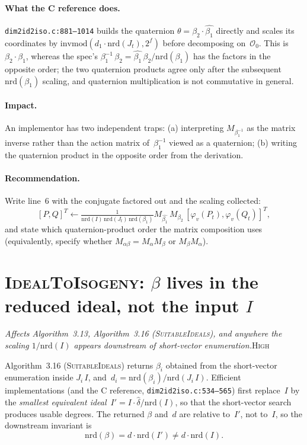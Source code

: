 \documentclass[a4paper,11pt]{article}
\newcommand{\algo}[1]{Algorithm~#1}
\newcommand{\high}{\textsc{\color{BurntOrange}High}}
\newcommand{\finding}[2]{\noindent\textit{#1}\hfill#2\par\smallskip}
\begin{document}
\paragraph{What the C reference does.}
\texttt{dim2id2iso.c:881--1014} builds the quaternion
$\theta = \beta_2 \cdot \widehat{\beta_1}$ directly and scales its
coordinates by $\mathrm{invmod}(d_1 \cdot \mathrm{nrd}(J_t),
2^f)$ before decomposing on~$\mathcal{O}_0$.  This is
$\beta_2 \cdot \widehat{\beta_1}$, whereas the spec's
$\beta_1^{-1}\,\beta_2 = \widehat{\beta_1}\,\beta_2 /
\mathrm{nrd}(\beta_1)$ has the factors in the opposite order; the
two quaternion products agree only after the subsequent
$\mathrm{nrd}(\beta_1)$ scaling, and quaternion multiplication is
not commutative in general.

\paragraph{Impact.}
An implementor has two independent traps: (a) interpreting
$M_{\beta_1^{-1}}$ as the matrix inverse rather than the action
matrix of~$\beta_1^{-1}$ viewed as a quaternion; (b) writing the
quaternion product in the opposite order from the derivation.

\paragraph{Recommendation.}
Write line~6 with the conjugate factored out and the scaling
collected:
\[
  [P, Q]^T \leftarrow
    \tfrac{1}{\mathrm{nrd}(I)\,\mathrm{nrd}(J_t)\,\mathrm{nrd}(\beta_1)}
    M_{\widehat{\beta_1}}\, M_{\beta_2}\, [\varphi_v(P_t),
    \varphi_v(Q_t)]^T,
\]
and state which quaternion-product order the matrix composition
uses (equivalently, specify whether $M_{\alpha\beta} = M_\alpha
M_\beta$ or $M_\beta M_\alpha$).

\section{\textsc{IdealToIsogeny}:
  \texorpdfstring{$\beta$}{beta} lives in the reduced ideal, not the
  input \texorpdfstring{$I$}{I}}
\label{sec:id2iso-reduced-ideal}

\finding{Affects \algo{3.13}, \algo{3.16} (\textsc{SuitableIdeals}),
  and anywhere the scaling $1/\mathrm{nrd}(I)$ appears downstream
  of short-vector enumeration.}{\high}

\algo{3.16} (\textsc{SuitableIdeals}) returns $\beta_i$ obtained
from the short-vector enumeration inside $J_i\,I$, and~$d_i =
\mathrm{nrd}(\beta_i)/\mathrm{nrd}(J_i\,I)$.  Efficient
implementations (and the C reference,
\texttt{dim2id2iso.c:534--565}) first replace~$I$ by the
\emph{smallest equivalent ideal}~$I' = I \cdot
\widehat{\delta}/\mathrm{nrd}(I)$, so that the short-vector
search produces usable degrees.  The returned $\beta$ and~$d$ are
relative to~$I'$, not to~$I$, so the downstream invariant is
\[
  \mathrm{nrd}(\beta) = d \cdot \mathrm{nrd}(I')
  \neq d \cdot \mathrm{nrd}(I).
\]
\end{document}
